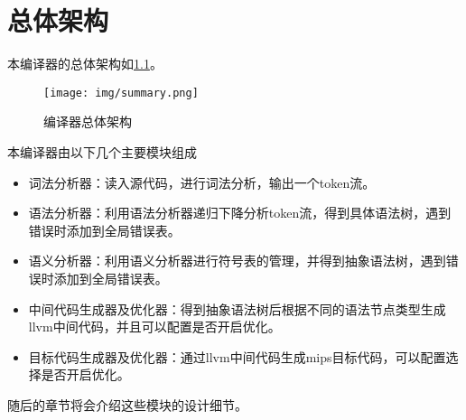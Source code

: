 \chapter{总体架构}
本编译器的总体架构如\ref{fig:summary}。

\begin{figure}[htbp]
	\centering
	\texttt{[image: img/summary.png]}
	\caption{编译器总体架构}
	\label{fig:summary}
\end{figure}

本编译器由以下几个主要模块组成
\begin{itemize}
    \item 词法分析器：读入源代码，进行词法分析，输出一个token流。
    \item 语法分析器：利用语法分析器递归下降分析token流，得到具体语法树，遇到错误时添加到全局错误表。
    \item 语义分析器：利用语义分析器进行符号表的管理，并得到抽象语法树，遇到错误时添加到全局错误表。
    \item 中间代码生成器及优化器：得到抽象语法树后根据不同的语法节点类型生成llvm中间代码，并且可以配置是否开启优化。
    \item 目标代码生成器及优化器：通过llvm中间代码生成mips目标代码，可以配置选择是否开启优化。
\end{itemize}

随后的章节将会介绍这些模块的设计细节。


